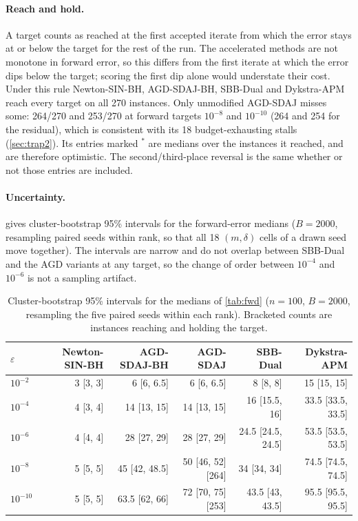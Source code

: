\paragraph{Reach and hold.}
A target counts as reached at the first accepted iterate from which the error
stays at or below the target for the rest of the run. The accelerated methods
are not monotone in forward error, so this differs from the first iterate at
which the error dips below the target; scoring the first dip alone would
understate their cost. Under this rule Newton-SIN-BH, AGD-SDAJ-BH, SBB-Dual
and Dykstra-APM reach every target on all 270 instances. Only unmodified
AGD-SDAJ misses some: 264/270 and 253/270 at forward targets $10^{-8}$ and
$10^{-10}$ (264 and 254 for the residual), which is consistent with its 18
budget-exhausting stalls (\cref{sec:trap2}). Its entries marked $^{*}$ are
medians over the instances it reached, and are therefore optimistic. The
second/third-place reversal is the same whether or not those entries are
included.
\paragraph{Uncertainty.}
 gives cluster-bootstrap 95\% intervals for the forward-error
medians ($B=2000$, resampling paired seeds within rank, so that all 18
$(m,\delta)$ cells of a drawn seed move together). The intervals are narrow
and do not overlap between SBB-Dual and the AGD variants at any target, so the
change of order between $10^{-4}$ and $10^{-6}$ is not a sampling artifact.

\begin{table}[t]
\centering
\caption{Cluster-bootstrap 95\% intervals for the medians of \cref{tab:fwd}
($n=100$, $B=2000$, resampling the five paired seeds within each rank).
Bracketed counts are instances reaching and holding the target.}
\label{tab:fwdci}
\small
\begin{tabular}{lrrrrr}
\toprule
$\varepsilon$ & Newton-SIN-BH & AGD-SDAJ-BH & AGD-SDAJ & SBB-Dual & Dykstra-APM\\
\midrule
$10^{-2}$  & 3 [3, 3] & 6 [6, 6.5] & 6 [6, 6.5] & 8 [8, 8] & 15 [15, 15]\\
$10^{-4}$  & 4 [3, 4] & 14 [13, 15] & 14 [13, 15] & 16 [15.5, 16] & 33.5 [33.5, 33.5]\\
$10^{-6}$  & 4 [4, 4] & 28 [27, 29] & 28 [27, 29] & 24.5 [24.5, 24.5] & 53.5 [53.5, 53.5]\\
$10^{-8}$  & 5 [5, 5] & 45 [42, 48.5] & 50 [46, 52] \tiny[264] & 34 [34, 34] & 74.5 [74.5, 74.5]\\
$10^{-10}$ & 5 [5, 5] & 63.5 [62, 66] & 72 [70, 75] \tiny[253] & 43.5 [43, 43.5] & 95.5 [95.5, 95.5]\\
\bottomrule
\end{tabular}
\end{table}

